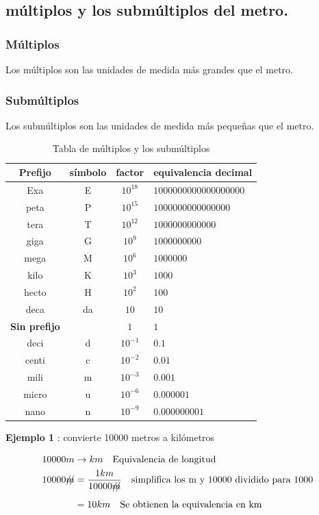 \documentclass[12pt]{article}
\begin{document}
 


\subsection{múltiplos y los submúltiplos del metro.} 
\subsubsection{Múltiplos}
Los múltiplos son las unidades de medida más grandes que el metro.
\subsubsection{Submúltiplos}
Los submúltiplos son las unidades de medida más pequeñas que el metro. 
\begin{table}[h]
    \centering
    \begin{tabular}{c|c|c|l}
         Prefijo & símbolo&factor  & equivalencia decimal  \\\hline
        Exa &  E & $10^{18}$& $1000000000000000000$\\
        peta &  P & $10^{15}$& $1000000000000000$\\
        tera &  T & $10^{12}$& $1000000000000$\\
        giga &  G & $10^{9}$& $1000000000$\\
        mega &  M & $10^{6}$& $1000000$\\
        kilo &  K & $10^{3}$& $1000$\\
        hecto &  H & $10^{2}$& $100$\\
        deca & da & $10$& $10$\\
        \textbf{Sin prefijo} &   & $1$& $1$\\
        deci &  d & $10^{-1}$& $0.1$\\
        centi&  c & $10^{-2}$& $0.01$\\
        mili&  m & $10^{-3}$& $0.001$\\
        micro & u & $10^{-6}$& $0.000001$\\
        nano & n  & $10^{-9}$& $0.000000001$ \\
        \hline
    \end{tabular}
    \caption{Tabla de múltiplos y los submúltiplos }
    \label{tab:múltiplos y los submúltiplos}
\end{table}

\begin{tcolorbox}[colback=red!15!]
\textbf{Ejemplo 1} : convierte 10000 metros a kilómetros
 
 
\begin{equation*} \label{vonverción de unidades}
\begin{split}
10000m&\rightarrow km\quad\text{Equivalencia de longitud}\\
10000\xout{m}& = \frac{1km}{10000\xout{m}}\quad\text{simplifica los m y 10000 dividido para 1000} \\
 & =10km        \quad\text{Se obtienen la equivalencia en km}
\end{split}
\end{equation*}
\end{tcolorbox}
\end{document}
